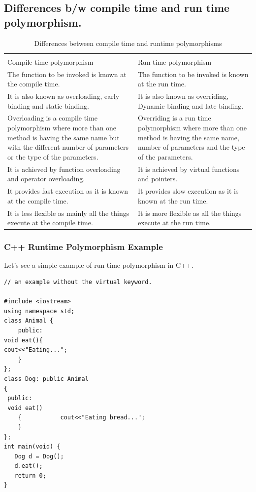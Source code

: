 \documentclass{book}
\begin{document}
\subsection{Differences b/w compile time and run time polymorphism.}

\begin{table} 
\tiny
\begin{tabular}{l|l} \hline \\
Compile time polymorphism	& Run time polymorphism \hline \\
The function to be invoked is known at the compile time.	& The function to be invoked is known at the run time. \\
It is also known as overloading, early binding and static binding.	& It is also known as overriding, Dynamic binding and late binding. \\
Overloading is a compile time polymorphism where more than one method is having the same name but with the different number of parameters or the type of the parameters.	& Overriding is a run time polymorphism where more than one method is having the same name, number of parameters and the type of the parameters. \\
It is achieved by function overloading and operator overloading.	& It is achieved by virtual functions and pointers. \\
It provides fast execution as it is known at the compile time.	& It provides slow execution as it is known at the run time. \\
It is less flexible as mainly all the things execute at the compile time.	& It is more flexible as all the things execute at the run time. \\ \hline 

\end{tabular}

\caption{Differences between compile time and runtime polymorphisms}

\end{table}
\normalsize

\subsubsection{C++ Runtime Polymorphism Example}

Let's see a simple example of run time polymorphism in C++.

\begin{lstlisting}
// an example without the virtual keyword.

#include <iostream>    
using namespace std;    
class Animal {    
    public:    
void eat(){      
cout<<"Eating...";      
    }        
};     
class Dog: public Animal      
{      
 public:    
 void eat()      
    {           cout<<"Eating bread...";      
    }      
};    
int main(void) {    
   Dog d = Dog();      
   d.eat();    
   return 0;    
}    
\end{lstlisting}
\end{document}
